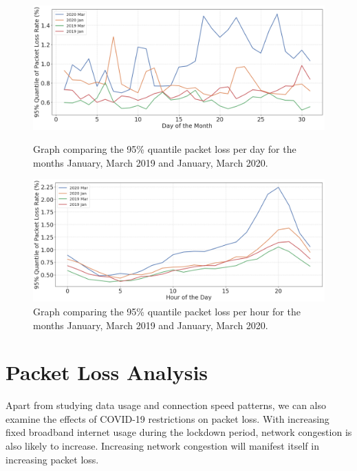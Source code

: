 \begin{figure}[t]
  \begin{minipage}[t]{0.496\linewidth}
    \centering
    \includegraphics[width=0.98\linewidth]{figs/packet_loss_per_day.png}
    \caption{Graph comparing the 95\% quantile packet loss per day for the months January, March 2019 and January, March 2020.}
    \label{fig:packetlossperday}
  \end{minipage}
  \begin{minipage}[t]{0.496\linewidth}
    \centering
    \includegraphics[width=0.98\linewidth]{figs/packet_loss_per_hour.png}
    \caption{Graph comparing the 95\% quantile packet loss per hour for the months January, March 2019 and January, March 2020.}
    \label{fig:packetlossperhour}
  \end{minipage}
\end{figure}

\section{Packet Loss Analysis}\label{sec:packet-loss-analysis}

Apart from studying data usage and connection speed patterns, we can also examine the effects of COVID-19 restrictions on packet loss. With increasing fixed broadband internet usage during the lockdown period, network congestion is also likely to increase. Increasing network congestion will manifest itself in increasing packet loss.

